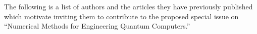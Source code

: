 \documentclass[]{article}
\begin{document}
\begin{comment}

Identifies papers and authors for possible inclusion in the special issue, with a brief description of each paper. (These papers do not need to have been written at this time, although it might be the case that work is already in progress.);

\end{comment}


The following is a list of authors and the articles they
have previously published which motivate inviting them to 
contribute to the proposed special issue on ``Numerical Methods for Engineering Quantum Computers.''
\end{document}
